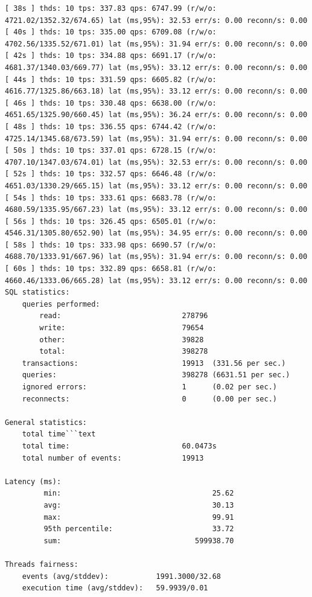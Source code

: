 \documentclass{article}
\begin{document}
\begin{verbatim}
[ 38s ] thds: 10 tps: 337.83 qps: 6747.99 (r/w/o: 4721.02/1352.32/674.65) lat (ms,95%): 32.53 err/s: 0.00 reconn/s: 0.00
[ 40s ] thds: 10 tps: 335.00 qps: 6709.08 (r/w/o: 4702.56/1335.52/671.01) lat (ms,95%): 31.94 err/s: 0.00 reconn/s: 0.00
[ 42s ] thds: 10 tps: 334.88 qps: 6691.17 (r/w/o: 4681.37/1340.03/669.77) lat (ms,95%): 33.12 err/s: 0.00 reconn/s: 0.00
[ 44s ] thds: 10 tps: 331.59 qps: 6605.82 (r/w/o: 4616.77/1325.86/663.18) lat (ms,95%): 33.12 err/s: 0.00 reconn/s: 0.00
[ 46s ] thds: 10 tps: 330.48 qps: 6638.00 (r/w/o: 4651.65/1325.90/660.45) lat (ms,95%): 36.24 err/s: 0.00 reconn/s: 0.00
[ 48s ] thds: 10 tps: 336.55 qps: 6744.42 (r/w/o: 4725.14/1345.68/673.59) lat (ms,95%): 31.94 err/s: 0.00 reconn/s: 0.00
[ 50s ] thds: 10 tps: 337.01 qps: 6728.15 (r/w/o: 4707.10/1347.03/674.01) lat (ms,95%): 32.53 err/s: 0.00 reconn/s: 0.00
[ 52s ] thds: 10 tps: 332.57 qps: 6646.48 (r/w/o: 4651.03/1330.29/665.15) lat (ms,95%): 33.12 err/s: 0.00 reconn/s: 0.00
[ 54s ] thds: 10 tps: 333.61 qps: 6683.78 (r/w/o: 4680.59/1335.95/667.23) lat (ms,95%): 33.12 err/s: 0.00 reconn/s: 0.00
[ 56s ] thds: 10 tps: 326.45 qps: 6505.01 (r/w/o: 4546.31/1305.80/652.90) lat (ms,95%): 34.95 err/s: 0.00 reconn/s: 0.00
[ 58s ] thds: 10 tps: 333.98 qps: 6690.57 (r/w/o: 4688.70/1333.91/667.96) lat (ms,95%): 31.94 err/s: 0.00 reconn/s: 0.00
[ 60s ] thds: 10 tps: 332.89 qps: 6658.81 (r/w/o: 4660.46/1333.06/665.28) lat (ms,95%): 33.12 err/s: 0.00 reconn/s: 0.00
SQL statistics:
    queries performed:
        read:                            278796
        write:                           79654
        other:                           39828
        total:                           398278
    transactions:                        19913  (331.56 per sec.)
    queries:                             398278 (6631.51 per sec.)
    ignored errors:                      1      (0.02 per sec.)
    reconnects:                          0      (0.00 per sec.)

General statistics:
    total time```text
    total time:                          60.0473s
    total number of events:              19913

Latency (ms):
         min:                                   25.62
         avg:                                   30.13
         max:                                   99.91
         95th percentile:                       33.72
         sum:                               599938.70

Threads fairness:
    events (avg/stddev):           1991.3000/32.68
    execution time (avg/stddev):   59.9939/0.01
\end{verbatim}
\end{document}
